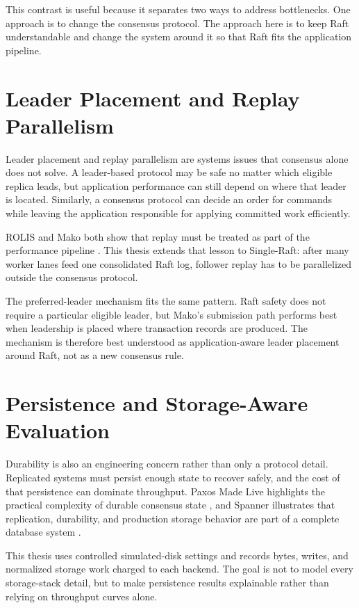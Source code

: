 This contrast is useful because it separates two ways to address bottlenecks.
One approach is to change the consensus protocol. The approach here is to keep
Raft understandable and change the system around it so that Raft fits the
application pipeline.

\section{Leader Placement and Replay Parallelism}

Leader placement and replay parallelism are systems issues that consensus
alone does not solve. A leader-based protocol may be safe no matter which
eligible replica leads, but application performance can still depend on where
that leader is located. Similarly, a consensus protocol can decide an order
for commands while leaving the application responsible for applying committed
work efficiently.

ROLIS and Mako both show that replay must be treated as part of the
performance pipeline \cite{rolis-eurosys22,mako-osdi25}. This thesis extends
that lesson to Single-Raft: after many worker lanes feed one consolidated Raft
log, follower replay has to be parallelized outside the consensus protocol.

The preferred-leader mechanism fits the same pattern. Raft safety does not
require a particular eligible leader, but Mako's submission path performs best
when leadership is placed where transaction records are produced. The
mechanism is therefore best understood as application-aware leader placement
around Raft, not as a new consensus rule.

\section{Persistence and Storage-Aware Evaluation}

Durability is also an engineering concern rather than only a protocol detail.
Replicated systems must persist enough state to recover safely, and the cost
of that persistence can dominate throughput. Paxos Made Live highlights the
practical complexity of durable consensus state \cite{paxos-made-live}, and
Spanner illustrates that replication, durability, and production storage
behavior are part of a complete database system \cite{spanner-osdi12}.

This thesis uses controlled simulated-disk settings and records bytes, writes,
and normalized storage work charged to each backend. The goal is not to model
every storage-stack detail, but to make persistence results explainable rather
than relying on throughput curves alone.
